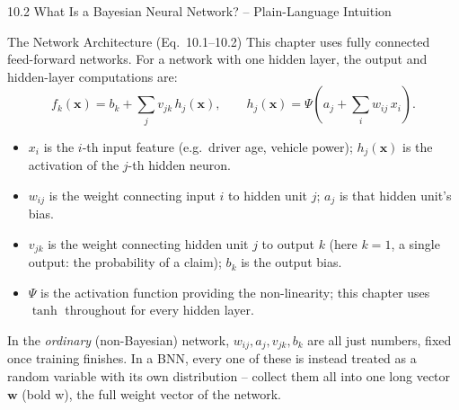 \documentclass[aspectratio=169,10pt]{beamer}
\newcommand{\bw}{\mathbf{w}}
\newcommand{\bx}{\mathbf{x}}
\begin{document}
\begin{frame}[allowframebreaks]{10.2 What Is a Bayesian Neural Network? -- Plain-Language Intuition}
  \begin{block}{The Network Architecture (Eq.\ 10.1--10.2)}
    This chapter uses fully connected feed-forward networks. For a network
    with one hidden layer, the output and hidden-layer computations are:
    \[
      f_k(\bx) = b_k + \sum_j v_{jk}\, h_j(\bx),
      \qquad
      h_j(\bx) = \Psi\!\left(a_j + \sum_i w_{ij}\, x_i\right).
    \]
    \begin{itemize}
      \item $x_i$ is the $i$-th input feature (e.g.\ driver age, vehicle
        power); $h_j(\bx)$ is the activation of the $j$-th hidden neuron.
      \item $w_{ij}$ is the weight connecting input $i$ to hidden unit $j$;
        $a_j$ is that hidden unit's bias.
      \item $v_{jk}$ is the weight connecting hidden unit $j$ to output $k$
        (here $k=1$, a single output: the probability of a claim); $b_k$ is
        the output bias.
      \item $\Psi$ is the activation function providing the non-linearity;
        this chapter uses $\tanh$ throughout for every hidden layer.
    \end{itemize}
    In the \emph{ordinary} (non-Bayesian) network, $w_{ij}, a_j, v_{jk}, b_k$
    are all just numbers, fixed once training finishes. In a BNN, every one
    of these is instead treated as a random variable with its own
    distribution -- collect them all into one long vector $\bw$ (bold w),
    the full weight vector of the network.
  \end{block}

  \framebreak


\end{frame}
\end{document}
